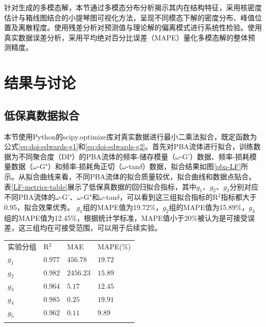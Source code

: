 针对生成的多模态解，本节通过多模态分布分析揭示其内在结构特征，采用核密度估计与箱线图结合的小提琴图可视化方法，呈现不同模态下解的密度分布、峰值位置及离散程度。使用残差分析对预测值与理论解的偏离模式进行系统性检验。使用真实数据误差分析，采用平均绝对百分比误差（MAPE）量化多模态解的整体预测精度。
\section{结果与讨论}
\subsection{低保真数据拟合}
本节使用Python的scipy.optimize库对真实数据进行最小二乘法拟合，既定函数为公式\eqref{eq:doi-edwards-g1}和\eqref{eq:doi-edwards-g2}。首先对PBA流体进行拟合，训练数据为不同聚合度（DP）的PBA流体的频率-储存模量（$\omega$-G'）数据、频率-损耗模量数据（$\omega$-G"）和频率-损耗角正切（$\omega$-tan$\delta$）数据，拟合结果如图\ref{pba-LF}所示。从拟合曲线来看，不同PBA流体的拟合质量较优，拟合曲线和数据点贴合。表\ref{LF-metrics-table}展示了低保真数据的回归拟合指标，其中$g_1$、$g_2$、$g_3$分别对应不同PBA流体的$\omega$-G'、$\omega$-G"和$\omega$-tan$\delta$，可以看到这三组拟合指标的R$^2$指标都大于0.95，拟合效果优秀。
$g_1$组的MAPE值为19.72\%，$g_2$组的MAPE值为15.89\%，$g_3$组的MAPE值为12.45\%，根据统计学标准，MAPE值小于20\%被认为是可接受误差，这三组均在可接受范围，可以用于后续实验。
\begin{table}
  \centering
  \small
  \begin{tabularx}{\textwidth}{>{\centering\arraybackslash}X >{\centering\arraybackslash}X >{\centering\arraybackslash}X >{\centering\arraybackslash}X} %
    \Xhline{1.5pt}
    实验分组  & R$^2$   & MAE       & MAPE(\%)                \tabularnewline
    \Xhline{0.5pt}  %
    $g_1$ & $0.977$ & $456.78$  & $19.72$ \tabularnewline
    $g_2$ & $0.982$ & $2456.23$ & $15.89 $ \tabularnewline
    $g_3$ & $0.964$ & $5.17$    & $12.45$ \tabularnewline
    $g_4$ & $0.985$ & $0.25$    & $19.91$\tabularnewline
    $g_5$ & $0.962$ & $0.11$    & $9.89$\tabularnewline
    \Xhline{1.5pt}
  \end{tabularx}
\end{table}
